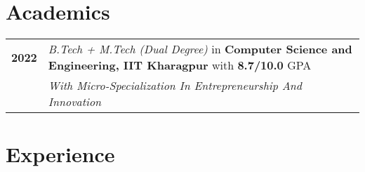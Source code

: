 \documentclass[a4paper,10pt]{extarticle} %
\begin{document}
\vspace{-0.4cm}
\section{\textcolor{primary}{Academics}}

\begin{tabular}{r|p{17.5cm}}	
\textbf{2022} & \textit{B.Tech + M.Tech (Dual Degree)} in \textbf{Computer Science and Engineering, IIT Kharagpur } with \textbf{8.7/10.0} GPA\\
\hfill & \textit{With Micro-Specialization In Entrepreneurship And Innovation}\\
\end{tabular}

\section{\textcolor{primary}{Experience}}
\end{document}
